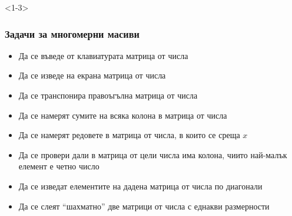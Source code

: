 \documentclass{beamer}
\begin{document}
\begin{frame}<1-3>
  \frametitle{Задачи за многомерни масиви}
  
  \begin{itemize}[<+->]
  \item Да се въведе от клавиатурата матрица от числа
  \item Да се изведе на екрана матрица от числа
  \item Да се транспонира правоъгълна матрица от числа
  \item Да се намерят сумите на всяка колона в матрица от числа
  \item Да се намерят редовете в матрица от числа, в които се среща $x$
  \item Да се провери дали в матрица от цели числа има колона, чиито най-малък елемент е четно число
  \item Да се изведат елементите на дадена матрица от числа по диагонали
  \item Да се слеят ``шахматно'' две матрици от числа с еднакви размерности
  \end{itemize}
\end{frame}
\end{document}
